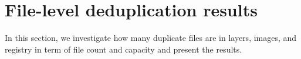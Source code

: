 \section{File-level deduplication results}
\label{sec:redundant_files}


In this section, we investigate how many duplicate files are in layers, images, and registry in term of file count and capacity and present the results.




